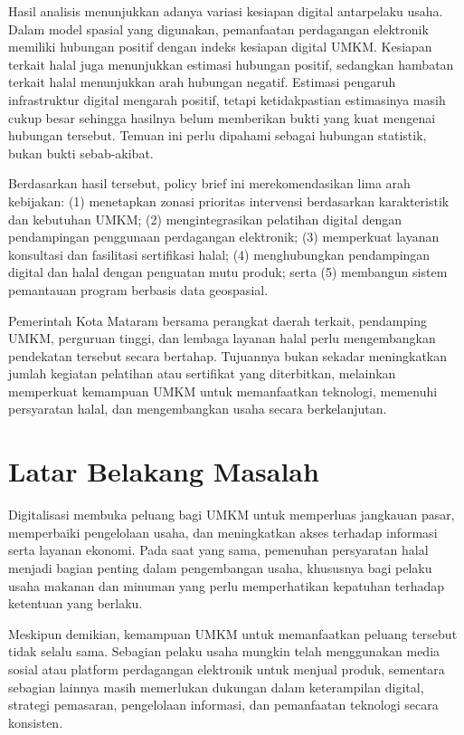 \documentclass[
  indonesian,
  11pt,
  a4paper,
]{report}
\begin{document}
Hasil analisis menunjukkan adanya variasi kesiapan digital antarpelaku
usaha. Dalam model spasial yang digunakan, pemanfaatan perdagangan
elektronik memiliki hubungan positif dengan indeks kesiapan digital
UMKM. Kesiapan terkait halal juga menunjukkan estimasi hubungan positif,
sedangkan hambatan terkait halal menunjukkan arah hubungan negatif.
Estimasi pengaruh infrastruktur digital mengarah positif, tetapi
ketidakpastian estimasinya masih cukup besar sehingga hasilnya belum
memberikan bukti yang kuat mengenai hubungan tersebut. Temuan ini perlu
dipahami sebagai hubungan statistik, bukan bukti sebab-akibat.

Berdasarkan hasil tersebut, policy brief ini merekomendasikan lima arah
kebijakan: (1) menetapkan zonasi prioritas intervensi berdasarkan
karakteristik dan kebutuhan UMKM; (2) mengintegrasikan pelatihan digital
dengan pendampingan penggunaan perdagangan elektronik; (3) memperkuat
layanan konsultasi dan fasilitasi sertifikasi halal; (4) menghubungkan
pendampingan digital dan halal dengan penguatan mutu produk; serta (5)
membangun sistem pemantauan program berbasis data geospasial.

Pemerintah Kota Mataram bersama perangkat daerah terkait, pendamping
UMKM, perguruan tinggi, dan lembaga layanan halal perlu mengembangkan
pendekatan tersebut secara bertahap. Tujuannya bukan sekadar
meningkatkan jumlah kegiatan pelatihan atau sertifikat yang diterbitkan,
melainkan memperkuat kemampuan UMKM untuk memanfaatkan teknologi,
memenuhi persyaratan halal, dan mengembangkan usaha secara
berkelanjutan.

\chapter*{Latar Belakang Masalah}\label{latar-belakang-masalah}

Digitalisasi membuka peluang bagi UMKM untuk memperluas jangkauan pasar,
memperbaiki pengelolaan usaha, dan meningkatkan akses terhadap informasi
serta layanan ekonomi. Pada saat yang sama, pemenuhan persyaratan halal
menjadi bagian penting dalam pengembangan usaha, khususnya bagi pelaku
usaha makanan dan minuman yang perlu memperhatikan kepatuhan terhadap
ketentuan yang berlaku.

Meskipun demikian, kemampuan UMKM untuk memanfaatkan peluang tersebut
tidak selalu sama. Sebagian pelaku usaha mungkin telah menggunakan media
sosial atau platform perdagangan elektronik untuk menjual produk,
sementara sebagian lainnya masih memerlukan dukungan dalam keterampilan
digital, strategi pemasaran, pengelolaan informasi, dan pemanfaatan
teknologi secara konsisten.
\end{document}
